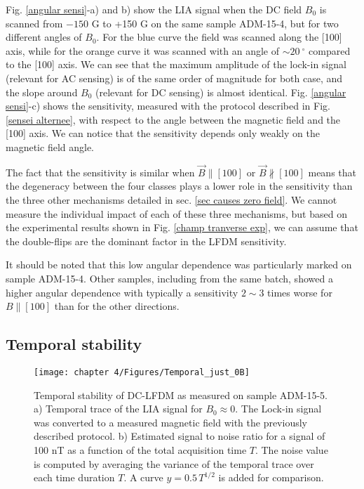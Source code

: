 \documentclass[a4paper, 11pt]{report}
\begin{document}
Fig. \ref{angular sensi}-a) and b) show the LIA signal when the DC field $B_0$ is scanned from $-150$ G to +150 G on the same sample ADM-15-4, but for two different angles of $B_0$. For the blue curve the field was scanned along the [100] axis, while for the orange curve it was scanned with an angle of $\sim 20\ ^\circ$ compared to the [100] axis. We can see that the maximum amplitude of the lock-in signal (relevant for AC sensing) is of the same order of magnitude for both case, and the slope around $B_0$ (relevant for DC sensing) is almost identical. Fig. \ref{angular sensi}-c) shows the sensitivity, measured with the protocol described in Fig. \ref{sensei alternee}, with respect to the angle between the magnetic field and the [100] axis. We can notice that the sensitivity depends only weakly on the magnetic field angle. 

The fact that the sensitivity is similar when $\vec{B}\parallel [100]$ or $\vec{B}\nparallel [100]$ means that the degeneracy between the four classes plays a lower role in the sensitivity than the three other mechanisms detailed in sec. \ref{sec causes zero field}. We cannot measure the individual impact of each of these three mechanisms, but based on the experimental results shown in Fig. \ref{champ tranverse exp}, we can assume that the double-flips are the dominant factor in the LFDM sensitivity.

It should be noted that this low angular dependence was particularly marked on sample ADM-15-4. Other samples, including from the same batch, showed a higher angular dependence with typically a sensitivity $2 \sim 3$ times worse for $B\parallel [100]$ than for the other directions.

\subsection{Temporal stability}
\begin{figure}[h!]
\centering
\texttt{[image: chapter 4/Figures/Temporal\_just\_0B]}
\caption{Temporal stability of DC-LFDM as measured on sample ADM-15-5. a) Temporal trace of the LIA signal for $B_0 \approx 0$. The Lock-in signal was converted to a measured magnetic field with the previously described protocol. b) Estimated signal to noise ratio for a signal of 100 nT as a function of the total acquisition time $T$. The noise value is computed by averaging the variance of the temporal trace over each time duration $T$. A curve $y=0.5\, T^{1/2}$ is added for comparison.}
\label{temporal 0B}
\end{figure}
\end{document}
